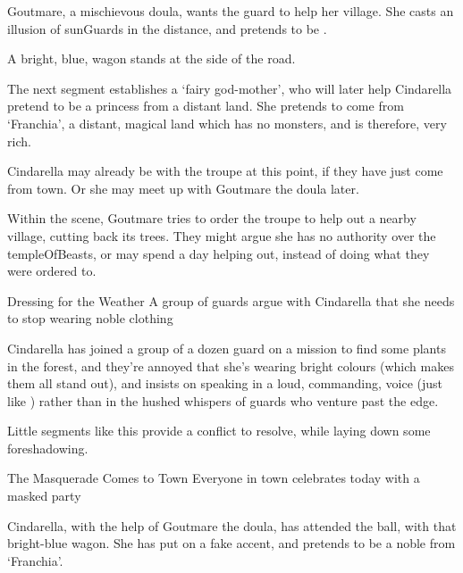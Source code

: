 \begin{multicols}{2}
\begin{exampletext}
  Goutmare, a mischievous \gls{doula}, wants the \gls{guard} to help her \gls{village}.
  She casts an illusion of \glspl{sunGuard} in the distance, and pretends to be .
\end{exampletext}

\begin{boxtext}
  A bright, blue, wagon stands at the side of the road.
\end{boxtext}

The next \gls{segment} establishes a `fairy god-mother', who will later help Cindarella pretend to be a princess from a distant land.
She pretends to come from `Franchia', a distant, magical land which has no monsters, and is therefore, very rich.

Cindarella may already be with the troupe at this point, if they have just come from town.
Or she may meet up with Goutmare the \gls{doula} later.

Within the scene, Goutmare tries to order the troupe to help out a nearby \gls{village}, cutting back its trees.
They might argue she has no authority over the \gls{templeOfBeasts}, or may spend a day helping out, instead of doing what they were ordered to.

{Dressing for the Weather}%
{A group of \glspl{guard} argue with Cindarella that she needs to stop wearing noble clothing}%

\begin{exampletext}
  Cindarella has joined a group of a dozen \gls{guard} on a mission to find some plants in the forest, and they're annoyed that she's wearing bright colours (which makes them all stand out), and insists on speaking in a loud, commanding, voice (just like ) rather than in the hushed whispers of \glspl{guard} who venture past the \gls{edge}.
\end{exampletext}

Little \glspl{segment} like this provide a conflict to resolve, while laying down some foreshadowing.

{\squash The Masquerade Comes to Town}%
{Everyone in town celebrates today with a masked party}%

\begin{exampletext}
  Cindarella, with the help of Goutmare the \gls{doula}, has attended the ball, with that bright-blue wagon.
  She has put on a fake accent, and pretends to be a noble from `Franchia'.
\end{exampletext}


\end{multicols}
